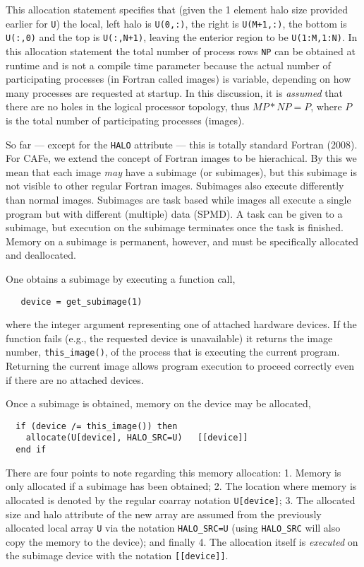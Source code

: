This allocation statement specifies that (given the 1 element halo size provided earlier for
\texttt{U}) the local, left halo is \texttt{U(0,:)}, the right is \texttt{U(M+1,:)},
the bottom is \texttt{U(:,0)} and the top is \texttt{U(:,N+1)}, leaving the enterior
region to be \texttt{U(1:M,1:N)}.  In this allocation statement the total number of
process rows \texttt{NP} can be obtained at runtime and is not a compile time parameter
because the actual number of participating processes (in Fortran called images) is
variable, depending on how many processes are requested at startup.  In this discussion,
it is \emph{assumed} that there are no holes in the logical processor topology, thus
$MP*NP = P$, where $P$ is the total number of participating processes (images).

So far --- except for the \texttt{HALO} attribute --- this is totally standard Fortran (2008).  For CAFe,
we extend the concept of Fortran images to be hierachical.  By this we mean that each image \emph{may}
have a subimage (or subimages), but this subimage is not visible to other regular Fortran images.
Subimages also execute differently than normal images.  Subimages are task based while images all
execute a single program but with different (multiple) data (SPMD).  A task can be given to a subimage,
but execution on the subimage terminates once the task is finished.  Memory on a subimage is
permanent, however, and must be specifically allocated and deallocated.

One obtains a subimage by executing a function call,
\begin{verbatim}
   device = get_subimage(1)
\end{verbatim}
where the integer argument representing one of attached hardware devices.  If the function
fails (e.g., the requested device is unavailable) it returns the image number,
\texttt{this\_image()}, of the process that is executing the current program.  Returning
the current image allows program execution to proceed correctly even if there are no
attached devices.

Once a subimage is obtained, memory on the device may be allocated,
\begin{verbatim}
  if (device /= this_image()) then
    allocate(U[device], HALO_SRC=U)   [[device]]
  end if
\end{verbatim}
There are four points to note regarding this memory allocation: 1. Memory is only
allocated if a subimage has been obtained; 2. The location where memory is allocated is
denoted by the regular coarray notation \texttt{U[device]}; 3. The allocated size and halo
attribute of the new array are assumed from the previously allocated local array
\texttt{U} via the notation \texttt{HALO\_SRC=U} (using \texttt{HALO\_SRC} will also copy
the memory to the device); and finally 4. The allocation itself is \emph{executed} on the
subimage device with the notation \texttt{[[device]]}.

